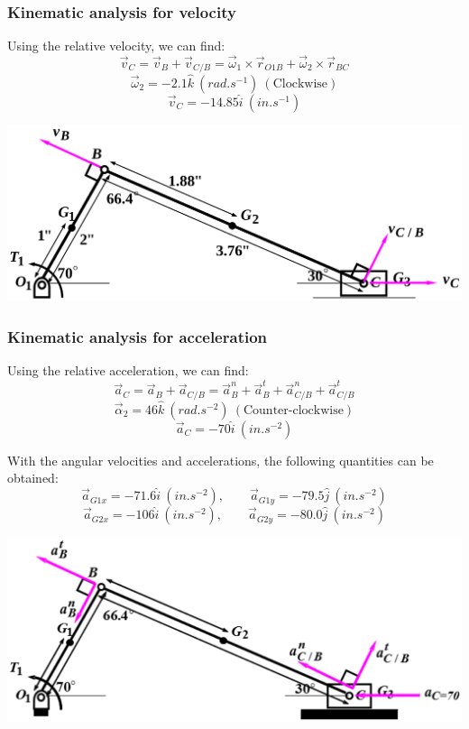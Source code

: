 \documentclass[11pt]{article}
\begin{document}
\subsubsection{Kinematic analysis for velocity}
\label{sec:org7d02609}
Using the relative velocity, we can find:
\[\vec{v}_C = \vec{v}_B + \vec{v}_{C / B} = \vec{\omega}_1 \times \vec{r}_{O1B} + \vec{\omega}_2 \times \vec{r}_{BC}\]
\[\vec{\omega}_2 = - 2.1 \hat{k} \ (\unit{rad.s^{-1}}) \ (\text{Clockwise})\]
\[\vec{v}_C = - 14.85 \hat{i} \ (\unit{in.s^{-1}})\]

\begin{center}
\includegraphics[width=.9\linewidth]{./images/dynamic-force-analysis-example-2-velocity-analysis-diagram.png}
\end{center}
\subsubsection{Kinematic analysis for acceleration}
\label{sec:orgc5a5ad1}
Using the relative acceleration, we can find:
\[\vec{a}_C = \vec{a}_B + \vec{a}_{C / B} = \vec{a}_B^n + \vec{a}_B^t + \vec{a}_{C /B}^n + \vec{a}_{C / B}^t\]
\[\vec{\alpha}_2 = 46 \hat{k} \ (\unit{rad.s^{-2}}) \ (\text{Counter-clockwise})\]
\[\vec{a}_C = - 70 \hat{i} \ (\unit{in.s^{-2}})\]

With the angular velocities and accelerations, the following quantities can be obtained:
\[\vec{a}_{G1x} = - 71.6 \hat{i} \ (\unit{in.s^{-2}}), \qquad \vec{a}_{G1y} = - 79.5 \hat{j} \ (\unit{in.s^{-2}})\]
\[\vec{a}_{G2x} = - 106 \hat{i} \ (\unit{in.s^{-2}}), \qquad \vec{a}_{G2y} = - 80.0 \hat{j} \ (\unit{in.s^{-2}})\]

\begin{center}
\includegraphics[width=.9\linewidth]{./images/dynamic-force-analysis-example-2-acceleration-analysis-diagram.png}
\end{center}
\end{document}
